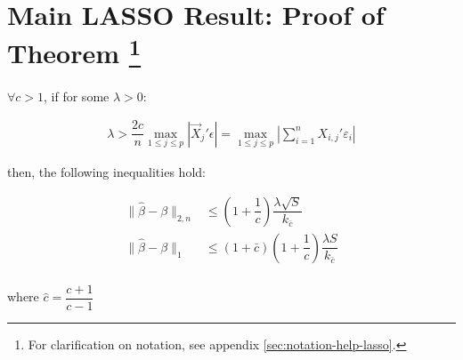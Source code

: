 \section*{
    Main LASSO Result: Proof of Theorem
    \footnote{For clarification on notation, see appendix \ref{sec:notation-help-lasso}.}
}

\begin{theorem}
\label{thm:main-lasso-result}
$\forall c > 1$, if for some $\lambda > 0$:

\begin{align*}
\lambda > \dfrac{2c}{n}
\max_{1 \leq j \leq p} \left|
    \Vec{X}_j' \epsilon
\right|
=
\max_{1 \leq j \leq p} \left|
    \sum_{i=1}^{n}X_{i,j}' \varepsilon_i
\right|
\end{align*}

then, the following inequalities hold:

\begin{align*}
\|\hat{\beta} - \beta\|_{2, n}
&\leq 
\left(1 + \dfrac{1}{c}\right)
\dfrac{\lambda \sqrt{S}}{k_{\bar{c}}}\\
\|\hat{\beta} - \beta\|_{1}
&\leq 
\left(1 + \bar{c}\right) \left(1 + \dfrac{1}{c}\right)
\dfrac{\lambda S}{k_{\bar{c}}}\\
\end{align*}

where $\hat{c} = \dfrac{c+1}{c-1}$
\end{theorem}